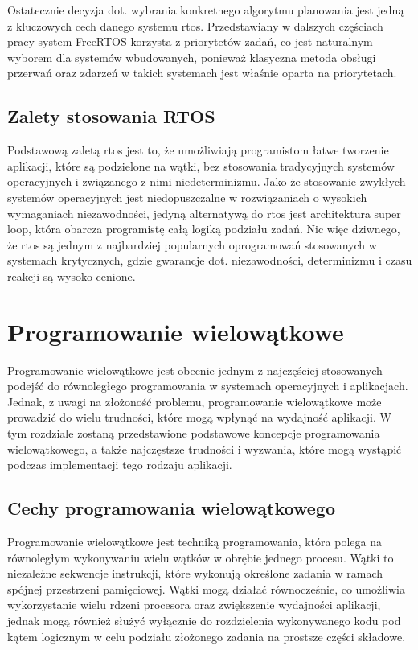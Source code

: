 Ostatecznie decyzja dot. wybrania konkretnego algorytmu planowania jest jedną z kluczowych cech danego systemu \gls{rtos}.
Przedstawiany w dalszych częściach pracy system FreeRTOS korzysta z priorytetów zadań, co jest naturalnym wyborem dla
systemów wbudowanych, ponieważ klasyczna metoda obsługi przerwań oraz zdarzeń w takich systemach jest właśnie oparta na priorytetach.


\subsection{Zalety stosowania RTOS}
Podstawową zaletą \gls{rtos} jest to, że umożliwiają programistom łatwe tworzenie aplikacji, które są podzielone na wątki,
bez stosowania tradycyjnych systemów operacyjnych i związanego z nimi niedeterminizmu\cite{wang2018review}.
Jako że stosowanie zwykłych systemów operacyjnych jest niedopuszczalne w rozwiązaniach o wysokich wymaganiach niezawodności,
jedyną alternatywą do \gls{rtos} jest architektura \gls{super loop}, która obarcza programistę całą logiką podziału zadań.
Nic więc dziwnego, że \gls{rtos} są jednym z najbardziej popularnych oprogramowań stosowanych w systemach krytycznych,
gdzie gwarancje dot. niezawodności, determinizmu i czasu reakcji są wysoko cenione.

\section{Programowanie wielowątkowe}
Programowanie wielowątkowe jest obecnie jednym z najczęściej stosowanych podejść do równoległego programowania
w systemach operacyjnych i aplikacjach. Jednak, z uwagi na złożoność problemu, programowanie wielowątkowe może prowadzić do wielu trudności,
które mogą wpłynąć na wydajność aplikacji. W tym rozdziale zostaną przedstawione podstawowe koncepcje programowania wielowątkowego,
a także najczęstsze trudności i wyzwania, które mogą wystąpić podczas implementacji tego rodzaju aplikacji.

\subsection{Cechy programowania wielowątkowego}
Programowanie wielowątkowe jest techniką programowania, która polega na równoległym wykonywaniu wielu wątków w obrębie jednego procesu\cite{butenhof2013programming}.
Wątki to niezależne sekwencje instrukcji, które wykonują określone zadania w ramach spójnej przestrzeni pamięciowej.
Wątki mogą działać równocześnie, co umożliwia wykorzystanie wielu rdzeni procesora oraz zwiększenie wydajności aplikacji,
jednak mogą również służyć wyłącznie do rozdzielenia wykonywanego kodu pod kątem logicznym w celu podziału złożonego zadania na prostsze
części składowe.

